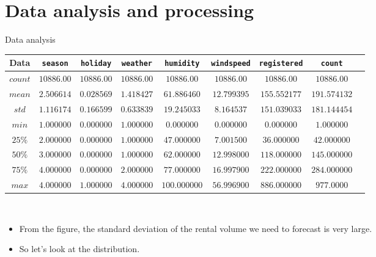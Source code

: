 \documentclass[
  size=14pt,
  paper=smartboard,  %
  mode=present, 		%
  display=slides, 	%
  style=tuliplab,  	%
  pauseslide,
  fleqn,leqno]{powerdot}
\begin{document}
\section{Data analysis and processing}
  \begin{slide}{Data analysis}
    \begin{tabular}{c| c c c c c c c c }
    \toprule
    Data & \texttt{season}  & \texttt{holiday}  & \texttt{weather}    & \texttt{humidity} & \texttt{windspeed} & \texttt{registered} & \texttt{count}\\
    \midrule
    $count$
    &  {$10886.00$} &  {$10886.00$} &  {$10886.00$} &  {$10886.00$} &  {$10886.00$} & {$10886.00$} & {$10886.00$}\\
    $mean$
    &  {$2.506614$} &  {$0.028569$}&  {$1.418427$}&  {$61.886460$} &  {$12.799395$}&  {$155.552177$}&  {$191.574132$}\\
    $std$
    &  {$1.116174$} &  {$0.166599$} &  {$0.633839$} &  {$19.245033$} &  {$8.164537$}&  {$151.039033$}&  {$181.144454$}& \\
    $min$
    &  {$1.000000$} &  {$0.000000$}&  {$1.000000$}&  {$0.000000$} &  {$0.000000$}&  {$0.000000$}&  {$1.000000$}\\
    ${25\%}$
    &  {$2.000000$} &  {$0.000000$} &  {$1.000000$} &  {$47.000000$}&  {$7.001500$} &  {$36.000000$} &  {$42.000000$}\\
    ${50\%}$
    &  {$3.000000$} &  {$0.000000$} &  {$1.000000$} &  {$62.000000$}&  {$12.998000$} &  {$118.000000$} &  {$145.000000$}\\
    ${75\%}$
    &  {$4.000000$} &  {$0.000000$} &  {$2.000000$} &  {$77.000000$}&  {$16.997900$} &  {$222.000000$} &  {$284.000000$}\\
    $max$
    &  {$4.000000$} &  {$1.000000$} &  {$4.000000$} &  {$100.000000$}&  {$56.996900$} &  {$886.000000$} &  {$977.0000$}\\
    \bottomrule
    \end{tabular}
    \\
      \begin{itemize}
      \item
      From the figure, the standard deviation of the rental volume we need to forecast is very large.
      \item
      So let's look at the distribution.\\
      \end{itemize}
    \end{slide}
\end{document}
